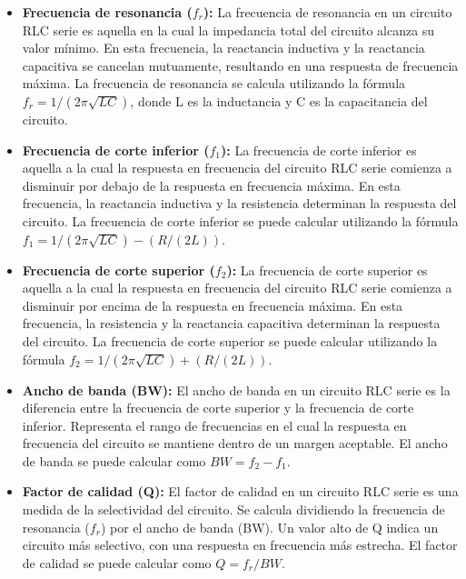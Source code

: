 \documentclass[12pt]{article}
\begin{document}
    \begin{itemize}
        \item \textbf{Frecuencia de resonancia ($f_{r}$):} La frecuencia de resonancia en un circuito RLC serie es aquella en la cual la impedancia total del circuito alcanza su valor mínimo. En esta frecuencia, la reactancia inductiva y la reactancia capacitiva se cancelan mutuamente, resultando en una respuesta de frecuencia máxima. La frecuencia de resonancia se calcula utilizando la fórmula $f_{r} = 1 / (2\pi\sqrt{LC})$, donde L es la inductancia y C es la capacitancia del circuito.
    
        \item \textbf{Frecuencia de corte inferior ($f_{1}$):} La frecuencia de corte inferior es aquella a la cual la respuesta en frecuencia del circuito RLC serie comienza a disminuir por debajo de la respuesta en frecuencia máxima. En esta frecuencia, la reactancia inductiva y la resistencia determinan la respuesta del circuito. La frecuencia de corte inferior se puede calcular utilizando la fórmula $f_{1} = 1 / (2\pi\sqrt{LC}) - (R / (2L))$.
    
        \item \textbf{Frecuencia de corte superior ($f_{2}$):} La frecuencia de corte superior es aquella a la cual la respuesta en frecuencia del circuito RLC serie comienza a disminuir por encima de la respuesta en frecuencia máxima. En esta frecuencia, la resistencia y la reactancia capacitiva determinan la respuesta del circuito. La frecuencia de corte superior se puede calcular utilizando la fórmula $f_{2} = 1 / (2\pi\sqrt{LC}) + (R / (2L))$.
    
        \item \textbf{Ancho de banda (BW):} El ancho de banda en un circuito RLC serie es la diferencia entre la frecuencia de corte superior y la frecuencia de corte inferior. Representa el rango de frecuencias en el cual la respuesta en frecuencia del circuito se mantiene dentro de un margen aceptable. El ancho de banda se puede calcular como $BW = f_{2} - f_{1}$.
    
        \item \textbf{Factor de calidad (Q):} El factor de calidad en un circuito RLC serie es una medida de la selectividad del circuito. Se calcula dividiendo la frecuencia de resonancia ($f_{r}$) por el ancho de banda (BW). Un valor alto de Q indica un circuito más selectivo, con una respuesta en frecuencia más estrecha. El factor de calidad se puede calcular como $Q = f_{r} / BW$.
    \end{itemize}
    
\end{document}
